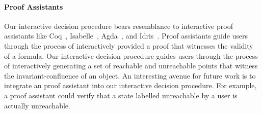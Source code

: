 \paragraph{Proof Assistants}
Our interactive decision procedure bears resemblance to interactive proof
assistants like Coq~\cite{coq2017}, Isabelle~\cite{nipkow2002isabelle},
Agda~\cite{norell2008dependently}, and Idris~\cite{brady2013idris}. Proof
assistants guide users through the process of interactively provided a proof
that witnesses the validity of a formula. Our interactive decision procedure
guides users through the process of interactively generating a set of reachable
and unreachable points that witness the invariant-confluence of an object. An
interesting avenue for future work is to integrate an proof assistant into our
interactive decision procedure. For example, a proof assistant could verify
that a state labelled unreachable by a user is actually unreachable.
